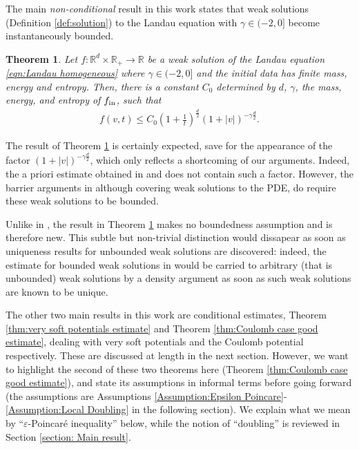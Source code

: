 \documentclass[12pt,american]{amsart}
\numberwithin{equation}{section}
\theoremstyle{plain}
\newtheorem{thm}{Theorem}[section]
\theoremstyle{definition}                  %
\def\fin{f_{\textnormal{in}}}
\begin{document}
The main {\em non-conditional} result in this work states that weak solutions (Definition \ref{def:solution}) to the Landau equation with $\gamma\in(-2,0]$ become instantaneously bounded.
\begin{thm}\label{thm:main soft potentials}
  Let $f: \mathbb{R}^d\times \mathbb{R}_+\to\mathbb{R}$ be a weak solution of the Landau equation \eqref{eqn:Landau homogeneous} where $\gamma \in(-2,0]$ and the initial data has finite mass, energy and entropy. Then, there is a constant $C_0$ determined by $d$, $\gamma$, the mass, energy, and entropy of $\fin$, such that
  \begin{align*}
    f(v,t) \leq C_0\left ( 1 + \frac{1}{t} \right )^{\frac{d}{2}} \left (1+|v| \right)^{-\gamma\tfrac{d}{2}}.
  \end{align*}  
\end{thm}
The result of Theorem \ref{thm:main soft potentials} is certainly expected, save for the appearance of the factor  $(1+|v|)^{-\gamma\tfrac{d}{2}}$, which only reflects a shortcoming of our arguments. Indeed, the a priori estimate obtained in \cite{Silvestre2015} and \cite{CamSilSne2017} does not contain such a factor. %
However, the barrier arguments in \cite{Silvestre2015,CamSilSne2017} although covering weak solutions to the PDE, do require these weak solutions to be bounded. 

Unlike in \cite{Silvestre2015,CamSilSne2017}, the result in Theorem \ref{thm:main soft potentials} makes no boundedness assumption and is therefore new. This subtle but non-trivial distinction would dissapear as soon as uniqueness results for unbounded weak solutions are discovered: indeed, the estimate for bounded weak solutions in \cite{Silvestre2015,CamSilSne2017} would be carried to arbitrary (that is unbounded) weak solutions by a density argument as soon as such weak solutions are known to be unique. 

The other two main results in this work are conditional estimates, Theorem \ref{thm:very soft potentials estimate} and Theorem \ref{thm:Coulomb case good estimate}, dealing with very soft potentials and the Coulomb potential respectively. These are discussed at length in the next section. However, we want to highlight the second of these two theorems here (Theorem \ref{thm:Coulomb case good estimate}), and state its assumptions in informal terms before going forward (the assumptions are Assumptions \ref{Assumption:Epsilon Poincare}-\ref{Assumption:Local Doubling} in the following section). We explain what we mean by ``$\varepsilon$-Poincar\'e inequality'' below, while the notion of ``doubling'' is reviewed in Section \ref{section: Main result}.
\end{document}
